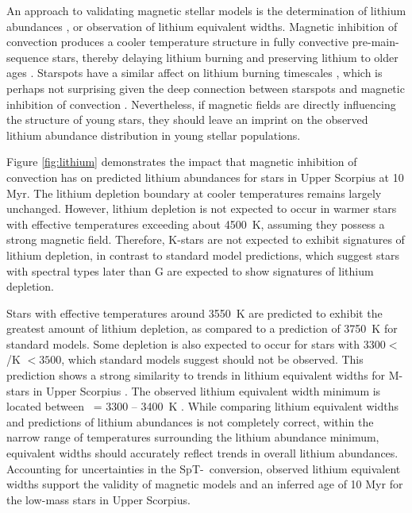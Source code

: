 \documentclass{aa}
\begin{document}
An approach to validating magnetic stellar models is the determination of lithium abundances \citep{MacDonald2015}, or observation of lithium equivalent widths. Magnetic inhibition of convection produces a cooler temperature structure in fully convective pre-main-sequence stars, thereby delaying lithium burning and preserving lithium to older ages \citep{Ventura1998, DAntona2000, MM10, FC13, Malo2014, MacDonald2015}. Starspots have a similar affect on lithium burning timescales \citep{Jackson2014b, Somers2015b}, which is perhaps not surprising given the deep connection between starspots and magnetic inhibition of convection \citep{Biermann1941, Deinzer1965}. Nevertheless, if magnetic fields are directly influencing the structure of young stars, they should leave an imprint on the observed lithium abundance distribution in young stellar populations.
 
Figure \ref{fig:lithium} demonstrates the impact that magnetic inhibition of convection has on predicted lithium abundances for stars in Upper Scorpius at 10 Myr. The lithium depletion boundary at cooler temperatures remains largely unchanged. However, lithium depletion is not expected to occur in warmer stars with effective temperatures exceeding about 4500~K, assuming they possess a strong magnetic field. Therefore, K-stars are not expected to exhibit signatures of lithium depletion, in contrast to standard model predictions, which suggest stars with spectral types later than G are expected to show signatures of lithium depletion. 

Stars with effective temperatures around 3550~K are predicted to exhibit the greatest amount of lithium depletion, as compared to a prediction of 3750~K for standard models. Some depletion is also expected to occur for stars with $3300 <$ \teff/K $< 3500$, which standard models suggest should not be observed. This prediction shows a strong similarity to trends in lithium equivalent widths for M-stars in Upper Scorpius \citep{Rizzuto2015}. The observed lithium equivalent width minimum is located between \teff\ = 3300 -- 3400~K \citep{Rizzuto2015}. While comparing lithium equivalent widths and predictions of lithium abundances is not completely correct, within the narrow range of temperatures surrounding the lithium abundance minimum, equivalent widths should accurately reflect trends in overall lithium abundances. Accounting for uncertainties in the SpT-\teff\ conversion, observed lithium equivalent widths support the validity of magnetic models and an inferred age of 10 Myr for the low-mass stars in Upper Scorpius. 
\end{document}
